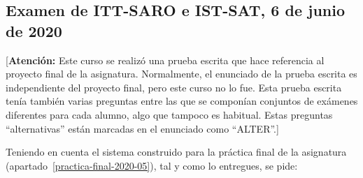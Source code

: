 \subsection{Examen de ITT-SARO e IST-SAT, 6 de junio de 2020}
\label{exa:saro-2020-05}

[\textbf{Atención:} Este curso se realizó una prueba escrita que hace referencia al proyecto final de la asignatura. Normalmente, el enunciado de la prueba escrita es independiente del proyecto final, pero este curso no lo fue. Esta prueba escrita tenía también varias preguntas entre las que se componían conjuntos de exámenes diferentes para cada alumno, algo que tampoco es habitual. Estas preguntas ``alternativas'' están marcadas en el enunciado como ``ALTER''.]

Teniendo en cuenta el sistema construido para la práctica final de la asignatura (apartado~\ref{practica-final-2020-05}), tal y como lo entregues, se pide:

